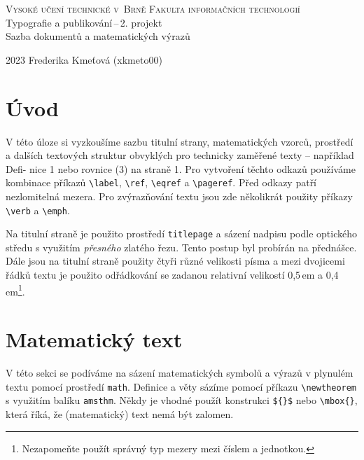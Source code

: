 \documentclass[a4paper, 11pt, twocolumn]{article}
\begin{document}
    \begin{titlepage}
        \begin{center}
            \textsc{\Huge Vysoké učení technické v~Brně \break \vspace{0.3em} Fakulta informačních technologií \\}
            {\LARGE Typografie a publikování\,--\,2. projekt \\ \vspace{0.3em} Sazba dokumentů a matematických výrazů}
    \end{center}
        {\Large 2023 \hfill Frederika Kmeťová (xkmeto00)}
    \end{titlepage}

    \newpage
    \section*{Úvod}
    V této úloze si vyzkoušíme sazbu titulní strany, mate\-matických vzorců, prostředí a dalších textových struktur obvyklých pro technicky zaměřené texty – například Defi- nice 1 nebo rovnice (3) na straně 1. Pro vytvoření těchto odkazů používáme kombinace příkazů \verb|\label|, \verb|\ref|, \verb|\eqref| a \verb|\pageref|. Před odkazy patří nezlomitelná mezera. Pro zvýrazňování textu jsou zde několikrát použity příkazy \verb|\verb| a \verb|\emph|.
    \par Na titulní straně je použito prostředí \verb|titlepage| a sá\-zení nadpisu podle optického středu s využitím \textit{přesného} zlatého řezu. Tento postup byl probírán na přednášce. Dále jsou na titulní straně použity čtyři různé velikosti písma a mezi dvojicemi řádků textu je použito odřádkování se zadanou relativní velikostí 0,5\,em a 0,4\,em\footnote[1]{Nezapomeňte použít správný typ mezery mezi číslem a jednotkou.}.

    \section{Matematický text}
    V této sekci se podíváme na sázení matematických sym\-bolů a výrazů v plynulém textu pomocí prostředí \verb|math|. Definice a věty sázíme pomocí příkazu \verb|\newtheorem| s využitím balíku \verb|amsthm|. Někdy je vhodné použít kon\-strukci \verb|${}$| nebo \verb|\mbox{}|, která říká, že (matematický) text nemá být zalomen.
    
\end{document}
